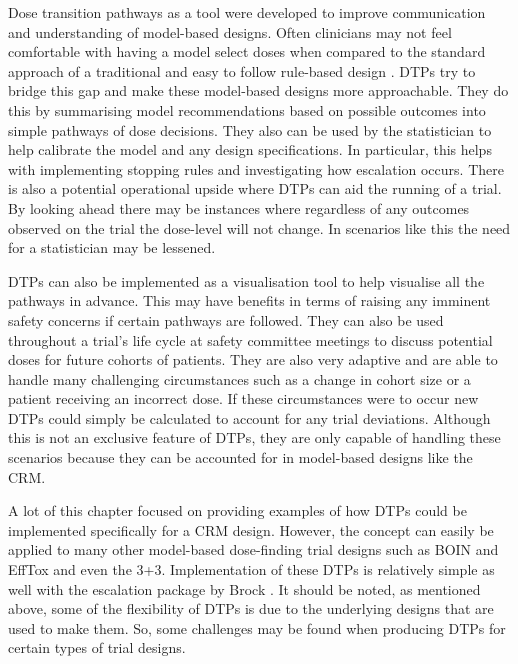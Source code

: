 Dose transition pathways as a tool were developed to improve communication and understanding of model-based designs. Often clinicians may not feel comfortable with having a model select doses when compared to the standard approach of a traditional and easy to follow rule-based design \cite{jakiUptakeNovelStatistical2013}. DTPs try to bridge this gap and make these model-based designs more approachable. They do this by summarising model recommendations based on possible outcomes into simple pathways of dose decisions. They also can be used by the statistician to help calibrate the model and any design specifications. In particular, this helps with implementing stopping rules and investigating how escalation occurs. There is also a potential operational upside where DTPs can aid the running of a trial. By looking ahead there may be instances where regardless of any outcomes observed on the trial the dose-level will not change. In scenarios like this the need for a statistician may be lessened. 

DTPs can also be implemented as a visualisation tool to help visualise all the pathways in advance. This may have benefits in terms of raising any imminent safety concerns if certain pathways are followed. They can also be used throughout a trial's life cycle at safety committee meetings to discuss potential doses for future cohorts of patients. They are also very adaptive and are able to handle many challenging circumstances such as a change in cohort size or a patient receiving an incorrect dose. If these circumstances were to occur new DTPs could simply be calculated to account for any trial deviations. Although this is not an exclusive feature of DTPs, they are only capable of handling these scenarios because they can be accounted for in model-based designs like the CRM. 

A lot of this chapter focused on providing examples of how DTPs could be implemented specifically for a CRM design. However, the concept can easily be applied to many other model-based dose-finding trial designs such as BOIN and EffTox and even the 3+3. Implementation of these DTPs is relatively simple as well with the escalation package by Brock \cite{brockModularApproachDose2020}. It should be noted, as mentioned above, some of the flexibility of DTPs is due to the underlying designs that are used to make them. So, some challenges may be found when producing DTPs for certain types of trial designs. 

